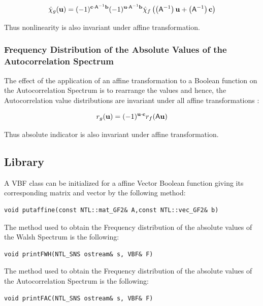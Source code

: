 \begin{equation}
\walsh{\chi}_g(\vec{u}) = (-1)^{\vec{c} \cdot \matr{A}^{-1} \vec{b}} (-1)^{\vec{u} \cdot \matr{A}^{-1} \vec{b}} \walsh{\chi}_f\left( \left(  \matr{A}^{-1} \right) \vec{u} + \left(  \matr{A}^{-1} \right) \vec{c} \right)
\end{equation}

Thus nonlinearity is also invariant under affine transformation.
 
\subsubsection{Frequency Distribution of the Absolute Values of the Autocorrelation Spectrum}

The effect of the application of an affine transformation to a Boolean function on the Autocorrelation Spectrum is to rearrange the values and hence, the Autocorrelation value distributions are invariant under all affine transformations \cite{Preneel:93}:

\begin{equation}
\R_{g}(\vec{u}) = (-1)^{\vec{u} \cdot \vec{c} } \R_{f}( \matr{A} \vec{u})
\end{equation}

Thus absolute indicator is also invariant under affine transformation.

\subsection{Library}

A VBF class can be initialized for a affine Vector Boolean function giving its corresponding matrix and vector by the following method:

\begin{verbatim}
void putaffine(const NTL::mat_GF2& A,const NTL::vec_GF2& b)
\end{verbatim}

The method used to obtain the Frequency distribution of the absolute values of the Walsh Spectrum is the following:

\begin{verbatim}
void printFWH(NTL_SNS ostream& s, VBF& F)
\end{verbatim}

The method used to obtain the Frequency distribution of the absolute values of the Autocorrelation Spectrum is the following:

\begin{verbatim}
void printFAC(NTL_SNS ostream& s, VBF& F)
\end{verbatim}

